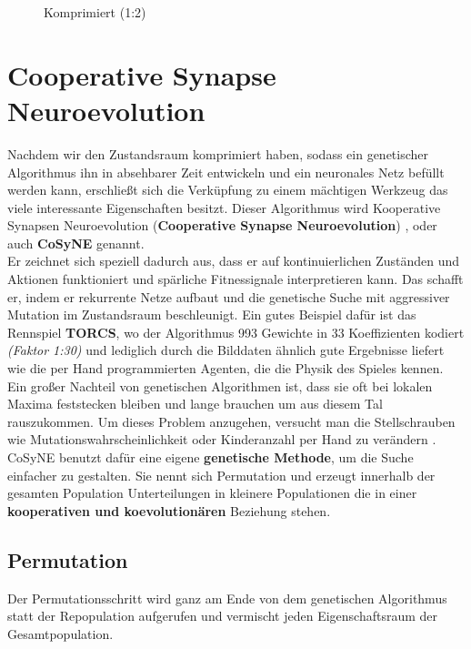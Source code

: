 \begin{multicols}{2}
\begin{figure}[H]
\begin{center}
                        \caption{Komprimiert (1:2)}\label{fig:dct-after}
                    \end{center}
                \end{figure}
            \end{multicols}

    \section{Cooperative Synapse Neuroevolution} \label{cosyne-definition}
        Nachdem wir den Zustandsraum komprimiert haben, sodass ein genetischer Algorithmus ihn in absehbarer Zeit entwickeln und ein neuronales Netz befüllt werden kann, erschließt sich die Verküpfung zu einem mächtigen Werkzeug das viele interessante Eigenschaften besitzt. Dieser Algorithmus wird Kooperative Synapsen Neuroevolution (\textbf{Cooperative Synapse Neuroevolution}) \cite{cosyne2}, oder auch \textbf{CoSyNE} genannt.\\

        \noindent
        Er zeichnet sich speziell dadurch aus, dass er auf kontinuierlichen Zuständen und Aktionen funktioniert und spärliche Fitnessignale interpretieren kann. Das schafft er, indem er rekurrente Netze aufbaut und die genetische Suche mit aggressiver Mutation im Zustandsraum beschleunigt. Ein gutes Beispiel dafür ist das Rennspiel \textbf{TORCS}\cite{cosyne3}, wo der Algorithmus 993 Gewichte in 33 Koeffizienten kodiert \textit{(Faktor 1:30)} und lediglich durch die Bilddaten ähnlich gute Ergebnisse liefert wie die per Hand programmierten Agenten, die die Physik des Spieles kennen.\\

        \noindent
        Ein großer Nachteil von genetischen Algorithmen ist, dass sie oft bei lokalen Maxima feststecken bleiben und lange brauchen um aus diesem Tal rauszukommen. Um dieses Problem anzugehen, versucht man die Stellschrauben wie Mutationswahrscheinlichkeit oder Kinderanzahl per Hand zu verändern \cite{grefenstette86}. CoSyNE benutzt dafür eine eigene \textbf{genetische Methode}, um die Suche einfacher zu gestalten. Sie nennt sich Permutation und erzeugt innerhalb der gesamten Population Unterteilungen in kleinere Populationen die in einer \textbf{kooperativen und koevolutionären} Beziehung stehen.
        \subsection{Permutation}
            Der Permutationsschritt wird ganz am Ende von dem genetischen Algorithmus statt der Repopulation aufgerufen und vermischt jeden \colorbox{green!25}{Eigenschaftsraum} der Gesamtpopulation. 

